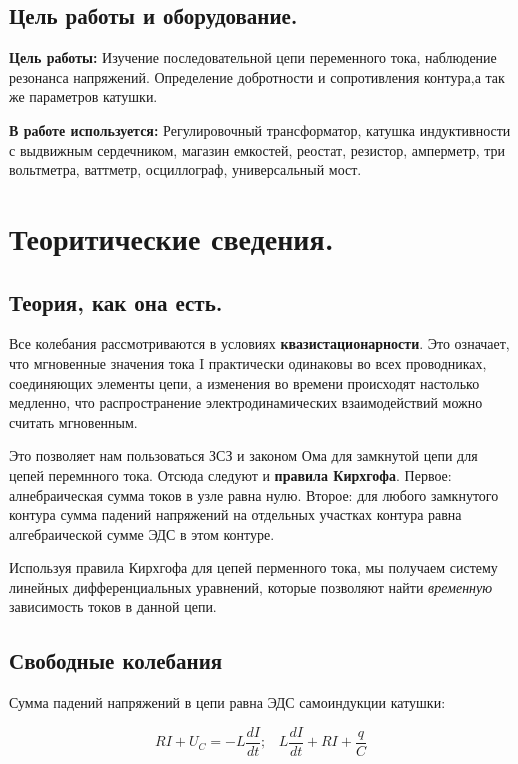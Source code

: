 \documentclass[a4paper,12pt]{article} %
\begin{document}
\subsection{Цель работы и оборудование.}

\textbf{Цель работы:} Изучение последовательной цепи переменного тока, наблюдение резонанса напряжений. Определение добротности и сопротивления контура,а так же параметров катушки.

\textbf{В работе используется:} Регулировочный трансформатор, катушка индуктивности с выдвижным сердечником, магазин емкостей, реостат, резистор, амперметр, три вольтметра, ваттметр, осциллограф, универсальный мост.

\section{Теоритические сведения.}

\subsection{Теория, как она есть.}

Все колебания рассмотриваются в условиях \textbf{квазистационарности}. Это означает, что мгновенные значения тока I практически одинаковы во всех проводниках, соединяющих элементы цепи, а изменения во времени происходят настолько медленно, что распространение электродинамических взаимодействий можно считать мгновенным.

Это позволяет нам пользоваться ЗСЗ и законом Ома для замкнутой цепи для цепей перемнного тока. Отсюда следуют и \textbf{правила Кирхгофа}. Первое: алнебраическая сумма токов в узле равна нулю. Второе: для любого замкнутого контура сумма падений напряжений на отдельных участках контура равна алгебраической сумме ЭДС в этом контуре.

Используя правила Кирхгофа для цепей перменного тока, мы получаем систему линейных дифференциальных уравнений, которые позволяют найти \textit{временную} зависимость токов в данной цепи.

\subsection{Свободные колебания}

Сумма падений напряжений в цепи равна ЭДС самоиндукции катушки:

\begin{equation}\label{2.4}
RI + U_C = -L \frac{dI}{dt};\;\;\;
L \frac{dI}{dt} + RI + \frac{q}{C}
\end{equation}
\end{document}
